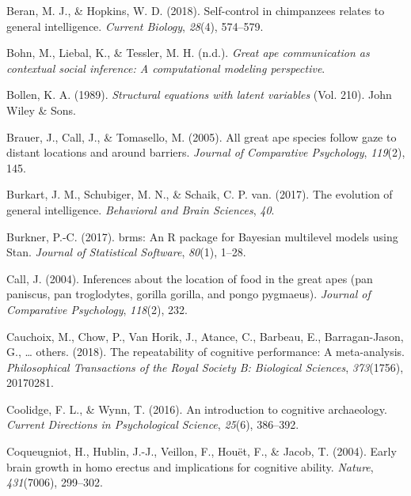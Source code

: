 \documentclass[
  man,floatsintext]{apa6}
\newlength{\cslhangindent}
\newlength{\cslentryspacingunit} %
\newenvironment{CSLReferences}[2] %
 {%
  \setlength{\parindent}{0pt}
  \ifodd #1
  \let\oldpar\par
  \def\par{\hangindent=\cslhangindent\oldpar}
  \fi
  \setlength{\parskip}{#2\cslentryspacingunit}
 }%
 {}
\begin{document}
\hypertarget{refs}{}
\begin{CSLReferences}{1}{0}
\leavevmode{}%
Beran, M. J., \& Hopkins, W. D. (2018). Self-control in chimpanzees relates to general intelligence. \emph{Current Biology}, \emph{28}(4), 574--579.

\leavevmode{}%
Bohn, M., Liebal, K., \& Tessler, M. H. (n.d.). \emph{Great ape communication as contextual social inference: A computational modeling perspective}.

\leavevmode{}%
Bollen, K. A. (1989). \emph{Structural equations with latent variables} (Vol. 210). John Wiley \& Sons.

\leavevmode{}%
Brauer, J., Call, J., \& Tomasello, M. (2005). All great ape species follow gaze to distant locations and around barriers. \emph{Journal of Comparative Psychology}, \emph{119}(2), 145.

\leavevmode{}%
Burkart, J. M., Schubiger, M. N., \& Schaik, C. P. van. (2017). The evolution of general intelligence. \emph{Behavioral and Brain Sciences}, \emph{40}.

\leavevmode{}%
Burkner, P.-C. (2017). {brms}: An {R} package for {Bayesian} multilevel models using {Stan}. \emph{Journal of Statistical Software}, \emph{80}(1), 1--28.

\leavevmode{}%
Call, J. (2004). Inferences about the location of food in the great apes (pan paniscus, pan troglodytes, gorilla gorilla, and pongo pygmaeus). \emph{Journal of Comparative Psychology}, \emph{118}(2), 232.

\leavevmode{}%
Cauchoix, M., Chow, P., Van Horik, J., Atance, C., Barbeau, E., Barragan-Jason, G., \ldots{} others. (2018). The repeatability of cognitive performance: A meta-analysis. \emph{Philosophical Transactions of the Royal Society B: Biological Sciences}, \emph{373}(1756), 20170281.

\leavevmode{}%
Coolidge, F. L., \& Wynn, T. (2016). An introduction to cognitive archaeology. \emph{Current Directions in Psychological Science}, \emph{25}(6), 386--392.

\leavevmode{}%
Coqueugniot, H., Hublin, J.-J., Veillon, F., Houët, F., \& Jacob, T. (2004). Early brain growth in homo erectus and implications for cognitive ability. \emph{Nature}, \emph{431}(7006), 299--302.


\end{CSLReferences}
\end{document}
